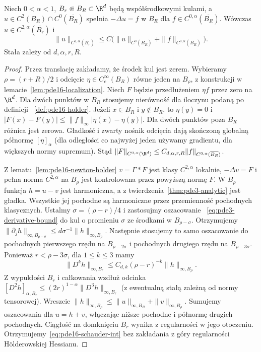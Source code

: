 \begin{twierdzenie}
\label{thm:pde16-schauder-poisson}
Niech $0<\alpha<1$, $B_r\Subset B_R\subset\R^d$
będą współśrodkowymi kulami, a
$u\in C^2(B_R)\cap C^0(\overline{B_R})$ spełnia
$-\Delta u=f$ w $B_R$ dla $f\in C^{0,\alpha}(\overline{B_R})$.
Wówczas $u\in C^{2,\alpha}(\overline{B_r})$ i
\begin{equation}\label{eq:pde16-schauder-int}
 \|u\|_{C^{2,\alpha}(\overline{B_r})}
 \le C\bigl(\|u\|_{C^0(\overline{B_R})}
 +\|f\|_{C^{0,\alpha}(\overline{B_R})}\bigr).
\end{equation}
Stała zależy od $d,\alpha,r,R$.
\end{twierdzenie}
\begin{proof}
Przez translację zakładamy, że środek kul jest zerem.
Wybieramy $\rho=(r+R)/2$ i odcięcie
$\eta\in C_c^\infty(B_R)$ równe jeden na $B_\rho$,
z konstrukcji w lemacie~\ref{lem:pde16-localization}.
Niech $F$ będzie przedłużeniem $\eta f$ przez zero
na $\R^d$. Dla dwóch punktów w $B_R$ stosujemy
nierówność dla iloczynu podaną po definicji
~\ref{def:pde16-holder}. Jeżeli $x\in B_R$ i
$y\notin B_R$, to $\eta(y)=0$ i
$|F(x)-F(y)|\le\|f\|_\infty|\eta(x)-\eta(y)|$.
Dla dwóch punktów poza $B_R$ różnica jest zerowa.
Gładkość i zwarty nośnik odcięcia dają skończoną
globalną półnormę $[\eta]_\alpha$ (dla odległości
co najwyżej jeden używamy gradientu, dla większych
normy supremum). Stąd
$\|F\|_{C^{0,\alpha}(\R^d)}
\le C_{d,\alpha,r,R}\|f\|_{C^{0,\alpha}(\overline{B_R})}$.

Z lematu~\ref{lem:pde16-newton-holder}
$v=\Gamma*F$ jest klasy $C^{2,\alpha}$ lokalnie,
$-\Delta v=F$ i pełna norma $C^{2,\alpha}$
na $\overline{B_\rho}$ jest kontrolowana przez
powyższą normę $F$.
W $B_\rho$ funkcja $h=u-v$ jest harmoniczna,
a z twierdzenia~\ref{thm:pde3-analytic} jest gładka.
Wszystkie jej pochodne są harmoniczne przez
przemienność pochodnych klasycznych. Ustalmy
$\sigma=(\rho-r)/4$ i zastosujmy oszacowanie
~\eqref{eq:pde3-derivative-bound}
do kul o promieniu $\sigma$ ze środkami
w $B_{\rho-\sigma}$. Otrzymujemy
$\|\partial_jh\|_{\infty,B_{\rho-\sigma}}
\le d\sigma^{-1}\|h\|_{\infty,B_\rho}$.
Następnie stosujemy to samo oszacowanie do pochodnych
pierwszego rzędu na $B_{\rho-2\sigma}$ i pochodnych
drugiego rzędu na $B_{\rho-3\sigma}$.
Ponieważ $r<\rho-3\sigma$, dla $1\le k\le3$ mamy
\[
 \|D^kh\|_{\infty,B_r}
 \le C_{d,k}(\rho-r)^{-k}\|h\|_{\infty,B_\rho}.
\]
Z wypukłości $B_r$ i całkowania wzdłuż odcinka
$[D^2h]_{\alpha,B_r}
\le (2r)^{1-\alpha}\|D^3h\|_{\infty,B_r}$
(z ewentualną stałą zależną od normy tensorowej).
Wreszcie
$\|h\|_{\infty,B_\rho}\le\|u\|_{\infty,B_R}
+\|v\|_{\infty,B_\rho}$.
Sumujemy oszacowania dla $u=h+v$,
włączając niższe pochodne i półnormę drugich pochodnych.
Ciągłość na domknięciu $B_r$ wynika z regularności
w jego otoczeniu. Otrzymujemy~\eqref{eq:pde16-schauder-int}
bez zakładania z góry regularności Hölderowskiej Hessianu.
\end{proof}

